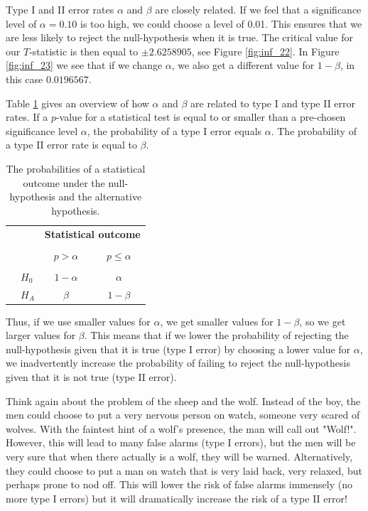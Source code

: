 \documentclass[]{book}\usepackage[]{graphicx}\usepackage[]{color}
\begin{document}
Type I and II error rates $\alpha$ and $\beta$ are closely related. If we feel that a significance level of $\alpha=0.10$ is too high, we could choose a level of 0.01. This ensures that we are less likely to reject the null-hypothesis when it is true. The critical value for our $T$-statistic is then equal to $\pm  2.6258905$, see Figure \ref{fig:inf_22}. In Figure \ref{fig:inf_23} we see that if we change $\alpha$, we also get a different value for $1-\beta$, in this case $0.0196567$.

Table \ref{fig:probs} gives an overview of how $\alpha$ and $\beta$ are related to type I and type II error rates. If a $p$-value for a statistical test is equal to or smaller than a pre-chosen significance level $\alpha$, the probability of a type I error equals $\alpha$. The probability of a type II error rate is equal to $\beta$. 

\begin{table}[ht]
\centering
\begin{tabular}{l l c c}
& & \multicolumn{2}{c}{\textbf{Statistical outcome}} \\
  \cline{3-4}
\vspace{-3.7mm} \\
& & $p > \alpha$  &  $p \leq \alpha$ \\
  \cline{2-4}
\vspace{-3.7mm} \\
& $H_0$ & $1-\alpha$ &  $\alpha$ \\
\raisebox{1.5ex}{\textbf{Truth}} & $H_A$  & $\beta$ & $1-\beta$ \\
  \cline{2-4}
\end{tabular}
\caption{The probabilities of a statistical outcome under the null-hypothesis and the alternative hypothesis.}
\label{fig:probs}
\end{table}


Thus, if we use smaller values for $\alpha$, we get smaller values for $1-\beta$, so we get larger values for $\beta$. This means that if we lower the probability of rejecting the null-hypothesis given that it is true (type I error) by choosing a lower value for $\alpha$, we inadvertently increase the probability of failing to reject the null-hypothesis given that it is not true (type II error). 

Think again about the problem of the sheep and the wolf. Instead of the boy, the men could choose to put a very nervous person on watch, someone very scared of wolves. With the faintest hint of a wolf's presence, the man will call out "Wolf!". However, this will lead to many false alarms (type I errors), but the men will be very sure that when there actually is a wolf, they will be warned. Alternatively, they could choose to put a man on watch that is very laid back, very relaxed, but perhaps prone to nod off. This will lower the risk of false alarms immensely (no more type I errors) but it will dramatically increase the risk of a type II error!
\end{document}
